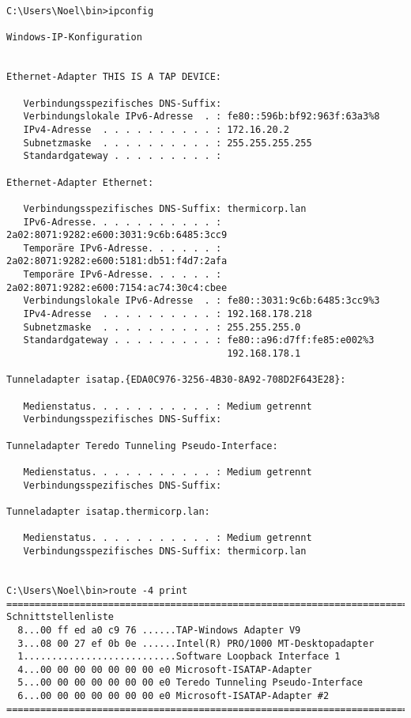 \begin{lstlisting}[caption=Ausgabe von ipconfig und route -4 print,label=lst:ipconfigroute4]
C:\Users\Noel\bin>ipconfig

Windows-IP-Konfiguration


Ethernet-Adapter THIS IS A TAP DEVICE:

   Verbindungsspezifisches DNS-Suffix:
   Verbindungslokale IPv6-Adresse  . : fe80::596b:bf92:963f:63a3%8
   IPv4-Adresse  . . . . . . . . . . : 172.16.20.2
   Subnetzmaske  . . . . . . . . . . : 255.255.255.255
   Standardgateway . . . . . . . . . :

Ethernet-Adapter Ethernet:

   Verbindungsspezifisches DNS-Suffix: thermicorp.lan
   IPv6-Adresse. . . . . . . . . . . : 2a02:8071:9282:e600:3031:9c6b:6485:3cc9
   Temporäre IPv6-Adresse. . . . . . : 2a02:8071:9282:e600:5181:db51:f4d7:2afa
   Temporäre IPv6-Adresse. . . . . . : 2a02:8071:9282:e600:7154:ac74:30c4:cbee
   Verbindungslokale IPv6-Adresse  . : fe80::3031:9c6b:6485:3cc9%3
   IPv4-Adresse  . . . . . . . . . . : 192.168.178.218
   Subnetzmaske  . . . . . . . . . . : 255.255.255.0
   Standardgateway . . . . . . . . . : fe80::a96:d7ff:fe85:e002%3
                                       192.168.178.1

Tunneladapter isatap.{EDA0C976-3256-4B30-8A92-708D2F643E28}:

   Medienstatus. . . . . . . . . . . : Medium getrennt
   Verbindungsspezifisches DNS-Suffix:

Tunneladapter Teredo Tunneling Pseudo-Interface:

   Medienstatus. . . . . . . . . . . : Medium getrennt
   Verbindungsspezifisches DNS-Suffix:

Tunneladapter isatap.thermicorp.lan:

   Medienstatus. . . . . . . . . . . : Medium getrennt
   Verbindungsspezifisches DNS-Suffix: thermicorp.lan


C:\Users\Noel\bin>route -4 print
===========================================================================
Schnittstellenliste
  8...00 ff ed a0 c9 76 ......TAP-Windows Adapter V9
  3...08 00 27 ef 0b 0e ......Intel(R) PRO/1000 MT-Desktopadapter
  1...........................Software Loopback Interface 1
  4...00 00 00 00 00 00 00 e0 Microsoft-ISATAP-Adapter
  5...00 00 00 00 00 00 00 e0 Teredo Tunneling Pseudo-Interface
  6...00 00 00 00 00 00 00 e0 Microsoft-ISATAP-Adapter #2
===========================================================================


\end{lstlisting}
